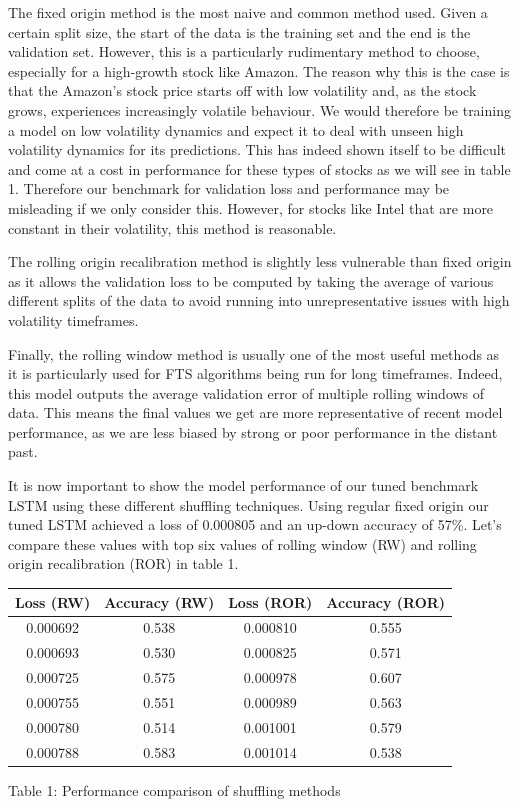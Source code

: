 \documentclass{article}
\begin{document}
The fixed origin method is the most naive and common method used. Given a certain split size, the start of the data is the training set and the end is the validation set. However, this is a particularly rudimentary method to choose, especially for a high-growth stock like Amazon. The reason why this is the case is that the Amazon's stock price starts off with low volatility and, as the stock grows, experiences increasingly volatile behaviour. We would therefore be training a model on low volatility dynamics and expect it to deal with unseen high volatility dynamics for its predictions. This has indeed shown itself to be difficult and come at a cost in performance for these types of stocks as we will see in table 1. Therefore our benchmark for validation loss and performance may be misleading if we only consider this. However, for stocks like Intel that are more constant in their volatility, this method is reasonable. 

The rolling origin recalibration method is slightly less vulnerable than fixed origin as it allows the validation loss to be computed by taking the average of various different splits of the data to avoid running into unrepresentative issues with high volatility timeframes. 

Finally, the rolling window method is usually one of the most useful methods as it is particularly used for FTS algorithms being run for long timeframes. Indeed, this model outputs the average validation error of multiple rolling windows of data. This means the final values we get are more representative of recent model performance, as we are less biased by strong or poor performance in the distant past.  

It is now important to show the model performance of our tuned benchmark LSTM using these different shuffling techniques. Using regular fixed origin our tuned LSTM achieved a loss of 0.000805 and an up-down accuracy of 57\%. Let's compare these values with top six values of rolling window (RW) and rolling origin recalibration (ROR) in table 1.

\begin{center}
 \begin{tabular}{||c c c c||} 
 \hline
 Loss (RW) & Accuracy (RW) & Loss (ROR) & Accuracy (ROR) \\ [0.5ex] 
 \hline\hline
 0.000692 & 0.538 & 0.000810 & 0.555 \\ 
 \hline
 0.000693 & 0.530 & 0.000825 & 0.571 \\
 \hline
 0.000725 & 0.575 & 0.000978 & 0.607 \\
 \hline
 0.000755 & 0.551 & 0.000989 & 0.563 \\
 \hline
 0.000780 & 0.514 & 0.001001 & 0.579 \\ 
 \hline
 0.000788 & 0.583 & 0.001014 & 0.538 \\  
 \hline
\end{tabular}
\end{center}
\begin{center}
    Table 1: Performance comparison of shuffling methods     
\end{center}
\end{document}
